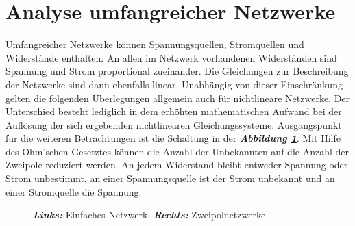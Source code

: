 \section{Analyse umfangreicher Netzwerke}
Umfangreicher Netzwerke können Spannungsquellen, Stromquellen und Widerstände enthalten. An allen im Netzwerk vorhandenen Widerständen sind Spannung und Strom proportional zueinander. Die Gleichungen zur Beschreibung der Netzwerke sind dann ebenfalls linear. Unabhängig von dieser Einschränkung gelten die folgenden Überlegungen allgemein auch für nichtlineare Netzwerke. Der Unterschied besteht lediglich in dem erhöhten mathematischen Aufwand bei der Auflösung der sich ergebenden nichtlinearen Gleichungssysteme.
\newline\newline
Ausgangspunkt für die weiteren Betrachtungen ist die Schaltung in der \textbf{\textit{Abbildung \ref{fig_IIIff}}}. Mit Hilfe des Ohm'schen Gesetztes können die Anzahl der Unbekannten auf die Anzahl der Zweipole reduziert werden. An jedem Widerstand bleibt entweder Spannung oder Strom unbestimmt, an einer Spannungsquelle ist der Strom unbekannt und an einer Stromquelle die Spannung. 
\begin{figure}[H]
\quad
{}
\centering
\caption{\textbf{\textit{Links:}} Einfaches Netzwerk. \textbf{\textit{Rechts:}} Zweipolnetzwerke.}
\label{fig_IIIff}
\end{figure}
